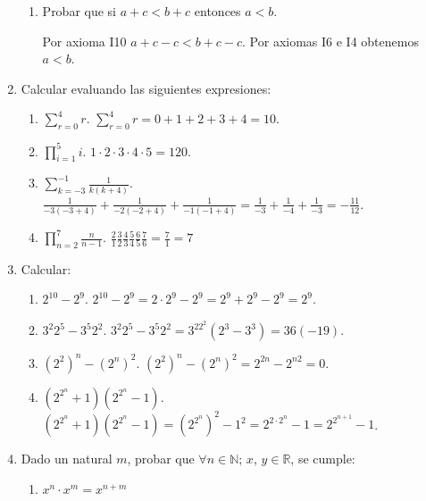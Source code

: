\begin{enumerate}
\begin{enumerate}
        
        
        
        \item Probar que si $a+c <b+c$ entonces $a<b$.
        
        \rta Por  axioma I10 $a+c -c  <b+c -c$. Por axiomas I6 e I4 obtenemos $a<b$.
    \end{enumerate}
    
    
    \item Calcular evaluando las siguientes expresiones:
        \begin{enumerate}
            \item $\displaystyle{\sum_{r=0}^4 r}$. \quad \rta $\displaystyle{\sum_{r=0}^4 r} = 0+1+2+3+4 = 10.$
            \item \quad $\displaystyle{\prod_{i=1}^5 i}$. \quad \rta $1 \cdot  2 \cdot 3 \cdot 4\cdot  5 = 120$. 
            \item  \quad $\displaystyle{\sum_{k=-3}^{-1} \frac{1}{k(k+4)}}$. \quad \rta  $\frac{1}{-3(-3+4)} +\frac{1}{-2(-2+4)} +\frac{1}{-1(-1+4)} = \frac{1}{-3} +\frac{1}{-4} +\frac{1}{-3} = -\frac{11}{12}$.
            \item \quad $\displaystyle{\prod_{n=2}^7 \frac{n}{n-1}}$. \quad \rta $\displaystyle{\frac{2}{1}\frac{3}{2}\frac{4}{3}\frac{5}{4}\frac{6}{5}\frac{7}{6} = \frac{7}{1} = 7}$
        \end{enumerate}

    
    \item Calcular:
        \begin{enumerate}
            \item \quad $2^{10} - 2^{9}$. \quad  \rta $2^{10} - 2^{9} = 2\cdot 2^{9} - 2^{9} = 2^{9} + 2^{9} -2^{9} = 2^{9}$.
            \item \quad $3^2 2^5 - 3^5 2^2$. \quad  \rta $3^2 2^5 - 3^5 2^2 = 3^22^2(2^3 -3^3) = 36 (-19)$.
            \item \quad $(2^2)^n - (2^n)^2$. \quad  \rta $(2^2)^n - (2^n)^2 = 2^{2n} - 2^{n2} =0$.
            \item \quad $(2^{2^n} + 1)  (2^{2^n} - 1)$. \quad  \rta $(2^{2^n} + 1)  (2^{2^n} - 1) = {(2^{2^n})}^2 -1^2 = 2^{2 \cdot 2^n} - 1 = 2^{2^{n+1}} - 1$.
        \end{enumerate}
    
    
    \item Dado un natural $m$, probar que $\forall n \in {\mathbb N} $; $x$, $y \in {\mathbb R}$, se cumple:
        \begin{enumerate}
            \item $x^n \cdot x^m = x^{n+m}$
            

\end{enumerate}
\end{enumerate}
